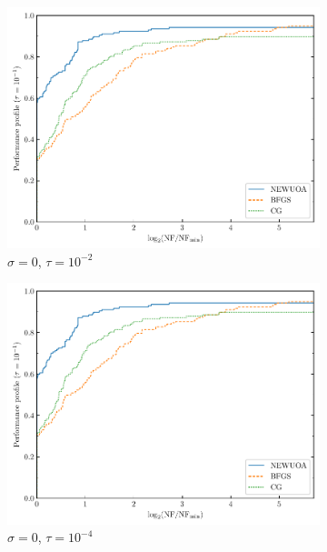 \documentclass[
    smallextended,  %
    final,          %
]{svjour3}
\begin{document}
\begin{figure}[htbp]
    \begin{subfigure}{.45\textwidth}
        \centering
        \includegraphics[width=\textwidth,page=2]{perf-plain-bfgs_cg_pdfo-50.pdf}
        \caption{$\sigma = 0$, $\tau = 10^{-2}$}
    \end{subfigure}
    \hfill
    \begin{subfigure}{.45\textwidth}
        \centering
        \includegraphics[width=\textwidth,page=4]{perf-plain-bfgs_cg_pdfo-50.pdf}
        \caption{$\sigma = 0$, $\tau = 10^{-4}$}
    \end{subfigure}
    \hfill
    \begin{subfigure}{.45\textwidth}

\end{subfigure}
\end{figure}
\end{document}
